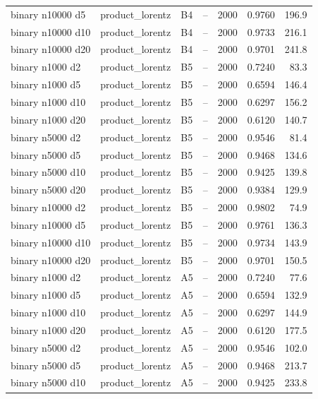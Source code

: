 \begin{longtable}{llllrrr}
binary n10000 d5 & product\_lorentz & B4 & -- & 2000 & 0.9760 & 196.9 \\
binary n10000 d10 & product\_lorentz & B4 & -- & 2000 & 0.9733 & 216.1 \\
binary n10000 d20 & product\_lorentz & B4 & -- & 2000 & 0.9701 & 241.8 \\
\rowcolor{oursbg}
binary n1000 d2 & product\_lorentz & B5 & -- & 2000 & 0.7240 & 83.3 \\
\rowcolor{oursbg}
binary n1000 d5 & product\_lorentz & B5 & -- & 2000 & 0.6594 & 146.4 \\
\rowcolor{oursbg}
binary n1000 d10 & product\_lorentz & B5 & -- & 2000 & 0.6297 & 156.2 \\
\rowcolor{oursbg}
binary n1000 d20 & product\_lorentz & B5 & -- & 2000 & 0.6120 & 140.7 \\
\rowcolor{oursbg}
binary n5000 d2 & product\_lorentz & B5 & -- & 2000 & 0.9546 & 81.4 \\
\rowcolor{oursbg}
binary n5000 d5 & product\_lorentz & B5 & -- & 2000 & 0.9468 & 134.6 \\
\rowcolor{oursbg}
binary n5000 d10 & product\_lorentz & B5 & -- & 2000 & 0.9425 & 139.8 \\
\rowcolor{oursbg}
binary n5000 d20 & product\_lorentz & B5 & -- & 2000 & 0.9384 & 129.9 \\
\rowcolor{oursbg}
binary n10000 d2 & product\_lorentz & B5 & -- & 2000 & 0.9802 & 74.9 \\
\rowcolor{oursbg}
binary n10000 d5 & product\_lorentz & B5 & -- & 2000 & 0.9761 & 136.3 \\
\rowcolor{oursbg}
binary n10000 d10 & product\_lorentz & B5 & -- & 2000 & 0.9734 & 143.9 \\
\rowcolor{oursbg}
binary n10000 d20 & product\_lorentz & B5 & -- & 2000 & 0.9701 & 150.5 \\
binary n1000 d2 & product\_lorentz & A5 & -- & 2000 & 0.7240 & 77.6 \\
binary n1000 d5 & product\_lorentz & A5 & -- & 2000 & 0.6594 & 132.9 \\
binary n1000 d10 & product\_lorentz & A5 & -- & 2000 & 0.6297 & 144.9 \\
binary n1000 d20 & product\_lorentz & A5 & -- & 2000 & 0.6120 & 177.5 \\
binary n5000 d2 & product\_lorentz & A5 & -- & 2000 & 0.9546 & 102.0 \\
binary n5000 d5 & product\_lorentz & A5 & -- & 2000 & 0.9468 & 213.7 \\
binary n5000 d10 & product\_lorentz & A5 & -- & 2000 & 0.9425 & 233.8 \\

\end{longtable}
